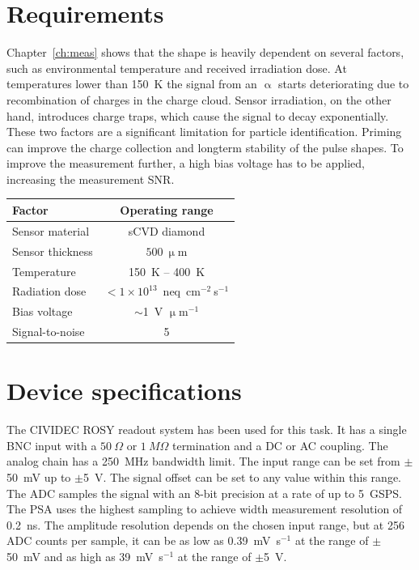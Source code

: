 \section{Requirements}
Chapter~\ref{ch:meas} shows that the shape is heavily dependent on several factors, such as environmental temperature and received irradiation dose. At temperatures lower than 150~K the signal from an $\upalpha$ starts deteriorating due to recombination of charges in the charge cloud. Sensor irradiation, on the other hand, introduces charge traps, which cause the signal to decay exponentially. These two factors are a significant limitation for particle identification. Priming can improve the charge collection and longterm stability of the pulse shapes. To improve the measurement further, a high bias voltage has to be applied, increasing the measurement SNR. 
\begin{center}
\begin{tabular}{l*{1}{c}}
Factor              & Operating range \\
\hline
Sensor material & sCVD diamond \\
Sensor thickness & $500~\upmu$m \\
Temperature & 150~K -- 400~K \\
Radiation dose & $<1\times10^{13}$~neq~cm$^{-2}~$s$^{-1}$ \\
Bias voltage & $\sim$1~V $\upmu$m$^{-1}$ \\
Signal-to-noise & 5 \\
\end{tabular}
\label{tab:limits}
\end{center}



\section{Device specifications}
The CIVIDEC ROSY readout system has been used for this task. It has a single BNC input with a $50~\Omega$ or $1~M\Omega$ termination and a DC or AC coupling. The analog chain has a 250~MHz bandwidth limit. The input range can be set from $\pm$50~mV up to $\pm$5~V. The signal offset can be set to any value within this range. The ADC samples the signal with an 8-bit precision at a rate of up to 5~GSPS. The PSA uses the highest sampling to achieve width measurement resolution of 0.2~ns. 
The amplitude resolution depends on the chosen input range, but at 256 ADC counts per sample, it can be as low as 0.39~mV~s$^{-1}$ at the range of $\pm$50~mV and as high as 39~mV~s$^{-1}$ at the range of $\pm$5~V.


